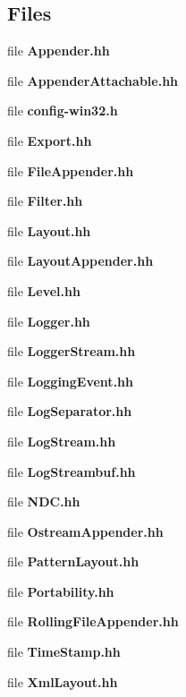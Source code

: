 \subsection*{Files}
\begin{DoxyCompactItemize}
\item 
file {\bf Appender.\-hh}
\item 
file {\bf Appender\-Attachable.\-hh}
\item 
file {\bf config-\/win32.\-h}
\item 
file {\bf Export.\-hh}
\item 
file {\bf File\-Appender.\-hh}
\item 
file {\bf Filter.\-hh}
\item 
file {\bf Layout.\-hh}
\item 
file {\bf Layout\-Appender.\-hh}
\item 
file {\bf Level.\-hh}
\item 
file {\bf Logger.\-hh}
\item 
file {\bf Logger\-Stream.\-hh}
\item 
file {\bf Logging\-Event.\-hh}
\item 
file {\bf Log\-Separator.\-hh}
\item 
file {\bf Log\-Stream.\-hh}
\item 
file {\bf Log\-Streambuf.\-hh}
\item 
file {\bf N\-D\-C.\-hh}
\item 
file {\bf Ostream\-Appender.\-hh}
\item 
file {\bf Pattern\-Layout.\-hh}
\item 
file {\bf Portability.\-hh}
\item 
file {\bf Rolling\-File\-Appender.\-hh}
\item 
file {\bf Time\-Stamp.\-hh}
\item 
file {\bf Xml\-Layout.\-hh}
\end{DoxyCompactItemize}
